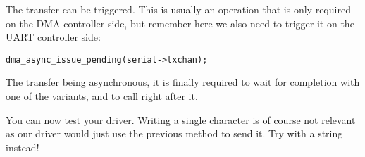 The transfer can be triggered. This is usually an operation that is only
required on the DMA controller side, but remember here we also need to trigger
it on the UART controller side:

\begin{verbatim}
dma_async_issue_pending(serial->txchan);
\end{verbatim}

The transfer being asynchronous, it is finally required to wait for completion
with one of the  variants, and to call
 right after it.

You can now test your driver. Writing a single character is of course not
relevant as our driver would just use the previous method to send it. Try with
a string instead!

